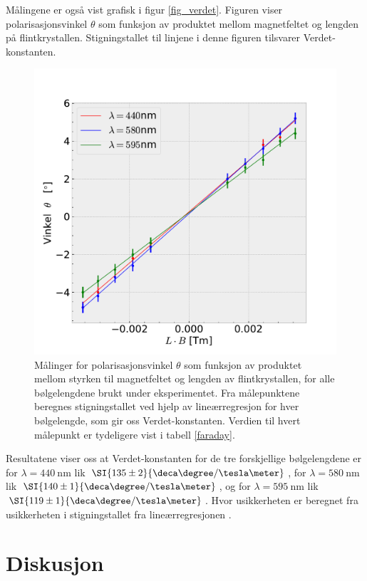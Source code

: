 \documentclass[%
 reprint,
nofootinbib,
aps,
]{revtex4-1}
\begin{document}
Målingene er også vist grafisk i figur \vref{fig_verdet}. Figuren viser polarisasjonsvinkel $\theta$ som funksjon av produktet mellom magnetfeltet og lengden på flintkrystallen. Stigningstallet til linjene i denne figuren tilsvarer Verdet-konstanten.
\begin{figure}[ht!]
  \centering
  \includegraphics[scale=0.45]{faraday_effekt.pdf}
  \caption{Målinger for polarisasjonsvinkel $\theta$ som funksjon av produktet mellom styrken til magnetfeltet og lengden av flintkrystallen, for alle bølgelengdene brukt under eksperimentet. Fra målepunktene beregnes stigningstallet ved hjelp av lineærregresjon for hver bølgelengde, som gir oss Verdet-konstanten. Verdien til hvert målepunkt er tydeligere vist i tabell \vref{faraday}.}
  \label{fig_verdet}
\end{figure}
Resultatene viser oss at Verdet-konstanten for de tre forskjellige bølgelengdene er for $\lambda = \SI{440}{\nano\meter}$ lik $\SI{135\pm2}{\deca\degree/\tesla\meter}$, for $\lambda = \SI{580}{\nano\meter}$ lik $\SI{140\pm1}{\deca\degree/\tesla\meter}$, og for $\lambda = \SI{595}{\nano\meter}$ lik
$\SI{119\pm1}{\deca\degree/\tesla\meter}$. Hvor usikkerheten er beregnet fra usikkerheten i stigningstallet fra lineærregresjonen \cite{squires}.
\section{Diskusjon}
\end{document}
